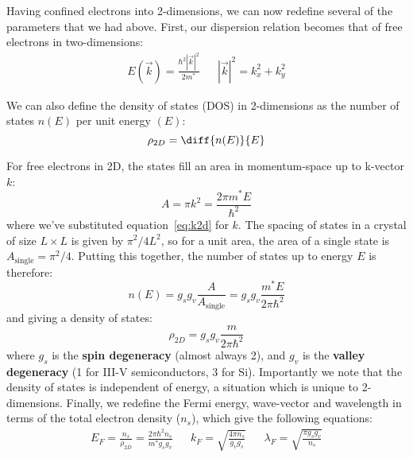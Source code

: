 Having confined electrons into 2-dimensions, we can now redefine several of the parameters that we had above. First, our
dispersion relation becomes that of free electrons in two-dimensions:
\begin{align}
  E(\vec{k}) = \frac{\hbar^2 |\vec{k}|^2}{2m^*} && |\vec{k}|^2 = k_x^2 + k_y^2
  \label{eq:k2d}
\end{align}

We can also define the density of states (DOS) in 2-dimensions as the number of states $n(E)$ per unit energy $(E)$:
\begin{equation}
  \rho_{2D} = \diff{n(E)}{E}
  \label{eq:raw2dden}
\end{equation}

For free electrons in 2D, the states fill an area in momentum-space up to k-vector $k$:
\begin{equation}
  A = \pi k^2 = \frac{2 \pi m^* E}{\hbar^2}
\end{equation}
where we've substituted equation~\ref{eq:k2d} for $k$. The spacing of states in a crystal of size $L \times L$ is given
by $\pi^2/4 L^2$, so for a unit area, the area of a single state is $A_{\textrm{single}} = \pi^2/4$. Putting this together,
the number of states up to energy $E$ is therefore:
\begin{equation}
  n(E) = g_s g_v \frac{A}{A_{\textrm{single}}} = g_s g_v \frac{m^* E}{2 \pi \hbar^2}
\end{equation}
and giving a density of states:
\begin{equation}
  \rho_{2D} = g_s g_v \frac{m}{2 \pi \hbar^2}
  \label{eq:2dden}
\end{equation}
where $g_s$ is the \textbf{spin degeneracy} (almost always 2), and $g_v$ is the \textbf{valley degeneracy} (1 for III-V semiconductors, 3 for Si).
Importantly we note that the density of states is independent of energy, a situation which is unique to 2-dimensions.
Finally, we redefine the Fermi energy, wave-vector and wavelength in terms of the total electron density ($n_s$), which give the following equations:
\begin{align}
  E_F = \frac{n_s}{\rho_{2D}} = \frac{2 \pi \hbar^2 n_s}{m^* g_s g_v} &&
  k_F = \sqrt{\frac{4 \pi n_s}{g_v g_s}} &&
  \lambda_F = \sqrt{\frac{\pi g_s g_v}{n_s}}
\end{align}

